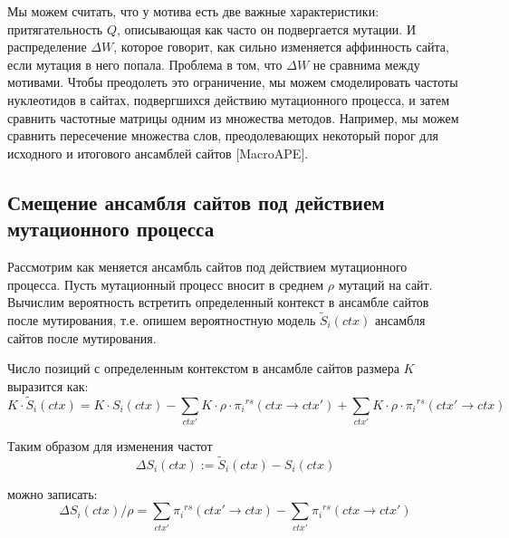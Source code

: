 \documentclass[a4paper]{article}
\newcommand\rs{{}^{rs}}
\begin{document}
Мы можем считать, что у мотива есть две важные характеристики: притягательность $Q$, описывающая как часто он подвергается мутации. И распределение $\Delta W$, которое говорит, как сильно изменяется аффинность сайта, если мутация в него попала. Проблема в том, что $\Delta W$ не сравнима между мотивами. Чтобы преодолеть это ограничение, мы можем смоделировать частоты нуклеотидов в сайтах, подвергшихся действию мутационного процесса, и затем сравнить частотные матрицы одним из множества методов. Например, мы можем сравнить пересечение множества слов, преодолевающих некоторый порог для исходного и итогового ансамблей сайтов [MacroAPE].

\subsection*{Смещение ансамбля сайтов под действием мутационного процесса}
\label{sub:ensemble_shift}
Рассмотрим как меняется ансамбль сайтов под действием мутационного процесса. Пусть мутационный процесс вносит в среднем $\rho$ мутаций на сайт. Вычислим вероятность встретить определенный контекст в ансамбле сайтов после мутирования, т.е. опишем вероятностную модель $\widetilde{S}_i(ctx)$ ансамбля сайтов после мутирования.

Число позиций с определенным контекстом в ансамбле сайтов размера $K$ выразится как:
\begin{equation}
K\cdot\widetilde{S}_i(ctx) = K\cdot S_i(ctx) - \sum_{ctx'} K\cdot\rho\cdot \pi_i\rs(ctx \to ctx') + \sum_{ctx'} K\cdot\rho\cdot \pi_i\rs(ctx' \to ctx)
\end{equation}

Таким образом для изменения частот
\begin{equation*}
\Delta S_i(ctx) := \widetilde{S}_i(ctx) - S_i(ctx)
\end{equation*}

можно записать:
\begin{equation}
\Delta S_i(ctx) / \rho = \sum_{ctx'} \pi_i\rs(ctx'\to ctx) - \sum_{ctx'} \pi_i\rs(ctx\to ctx')
\end{equation}
\end{document}
